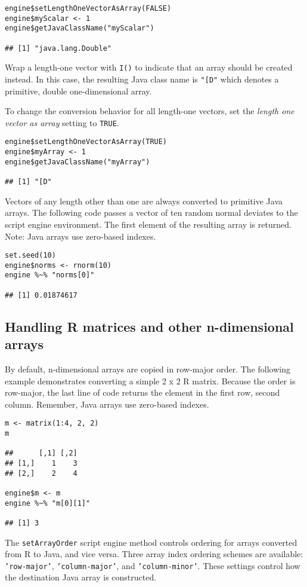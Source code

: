 \documentclass[
article,
11pt, %
a4paper, %
oneside, %
headinclude,footinclude, %
]{scrartcl}
\theoremstyle{definition} %
\theoremstyle{plain} %
\theoremstyle{remark} %
\newcommand{\code}[1]{\texttt{#1}}
\newcommand{\strong}[1]{\texorpdfstring{{\normalfont\fontseries{b}\selectfont #1}}{#1}}
\begin{document}
\begin{verbatim}
engine$setLengthOneVectorAsArray(FALSE)
engine$myScalar <- 1
engine$getJavaClassName("myScalar")

## [1] "java.lang.Double"
\end{verbatim}
Wrap a length-one vector with \code{I()} to indicate that an array should be created instead. In this case, the resulting Java class name is \code{"[D"} which denotes a primitive, double one-dimensional array.

To change the conversion behavior for all length-one vectors, set the \textit{length one vector as array} setting to \code{TRUE}.
\begin{verbatim}
engine$setLengthOneVectorAsArray(TRUE)
engine$myArray <- 1
engine$getJavaClassName("myArray")

## [1] "[D"
\end{verbatim}

Vectors of any length other than one are always converted to primitive Java arrays. The following code passes a vector of ten random normal deviates to the script engine environment. The first element of the resulting array is returned. \strong{Note:} Java arrays use zero-based indexes.

\begin{verbatim}
set.seed(10)
engine$norms <- rnorm(10)
engine %~% "norms[0]"

## [1] 0.01874617
\end{verbatim}

\subsection{Handling R matrices and other n-dimensional arrays}

By default, n-dimensional arrays are copied in row-major order. The following example demonstrates converting a simple 2 x 2 R matrix. Because the order is row-major, the last line of code returns the element in the first row, second column. Remember, Java arrays use zero-based indexes.

\begin{verbatim}
m <- matrix(1:4, 2, 2)
m

##      [,1] [,2]
## [1,]    1    3
## [2,]    2    4

engine$m <- m
engine %~% "m[0][1]"

## [1] 3
\end{verbatim}

The \code{setArrayOrder} script engine method controls ordering for arrays converted from R to Java, and vice versa. Three array index ordering schemes are available: \code{'row-major'}, \code{'column-major'}, and \code{'column-minor'}. These settings control how the destination Java array is constructed.
\end{document}
